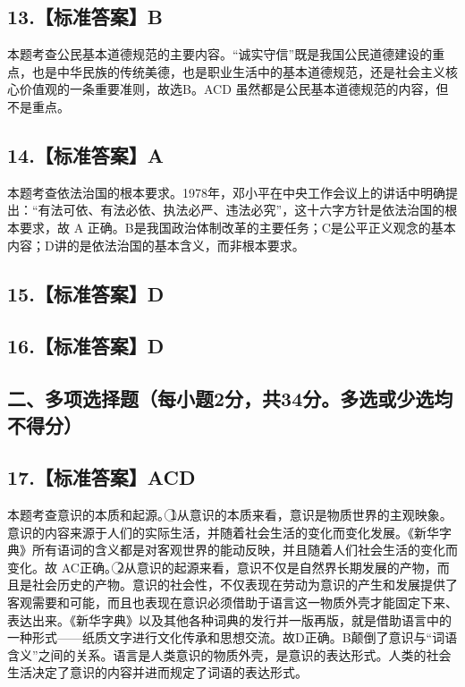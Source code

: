 \documentclass[UTF8,11pt]{ctexart}
\begin{document}
\subsection*{13.【标准答案】B}

本题考查公民基本道德规范的主要内容。“诚实守信”既是我国公民道德建设的重点，也是中华民族的传统美德，也是职业生活中的基本道德规范，还是社会主义核心价值观的一条重要准则，故选B。ACD 虽然都是公民基本道德规范的内容，但不是重点。


\subsection*{14.【标准答案】A}

本题考查依法治国的根本要求。1978年，邓小平在中央工作会议上的讲话中明确提出：“有法可依、有法必依、执法必严、违法必究”，这十六字方针是依法治国的根本要求，故 A 正确。B是我国政治体制改革的主要任务；C是公平正义观念的基本内容；D讲的是依法治国的基本含义，而非根本要求。


\subsection*{15.【标准答案】D}

\subsection*{16.【标准答案】D}

\subsection*{二、多项选择题（每小题2分，共34分。多选或少选均不得分）}

\subsection*{17.【标准答案】ACD}

本题考查意识的本质和起源。\textcircled{1}从意识的本质来看，意识是物质世界的主观映象。意识的内容来源于人们的实际生活，并随着社会生活的变化而变化发展。《新华字典》所有语词的含义都是对客观世界的能动反映，并且随着人们社会生活的变化而变化。故 AC正确。\textcircled{2}从意识的起源来看，意识不仅是自然界长期发展的产物，而且是社会历史的产物。意识的社会性，不仅表现在劳动为意识的产生和发展提供了客观需要和可能，而且也表现在意识必须借助于语言这一物质外壳才能固定下来、表达出来。《新华字典》以及其他各种词典的发行并一版再版，就是借助语言中的一种形式——纸质文字进行文化传承和思想交流。故D正确。B颠倒了意识与“词语含义”之间的关系。语言是人类意识的物质外壳，是意识的表达形式。人类的社会生活决定了意识的内容并进而规定了词语的表达形式。
\end{document}
